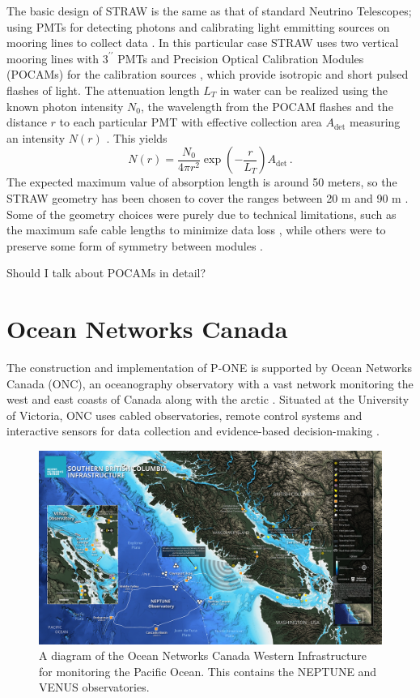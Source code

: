 The basic design of STRAW is the same as that of standard Neutrino Telescopes; using PMTs for detecting photons and calibrating light emmitting sources on mooring lines to collect data \cite{straw}. In this particular case STRAW uses two vertical mooring lines with $3^{\prime\prime}$ PMTs and Precision Optical Calibration Modules (POCAMs) for the calibration sources \cite{straw}, which provide isotropic and short pulsed flashes of light. The attenuation length $L_{T}$ in water can be realized using the known photon intensity $N_{0}$, the wavelength from the POCAM flashes and the distance $r$ to each particular PMT with effective collection area $A_{\text{det}}$ measuring an intensity $N(r)$ \cite{straw}. This yields
\begin{equation}
  N(r) = \frac{N_{0}}{4\pi r^{2}}\exp\left(-\frac{r}{L_{T}}\right)A_{\text{det}}\, .
\end{equation}
The expected maximum value of absorption length is around 50 meters, so the STRAW geometry has been chosen to cover the ranges between 20 m and 90 m \cite{straw}. Some of the geometry choices were purely due to technical limitations, such as the maximum safe cable lengths to minimize data loss \cite{straw}, while others were to preserve some form of symmetry between modules \cite{straw}.

Should I talk about POCAMs in detail? \cite{pocam}

\section{Ocean Networks Canada}

The construction and implementation of P-ONE is supported by Ocean Networks Canada (ONC), an oceanography observatory with a vast network monitoring the west and east coasts of Canada along with the arctic \cite{onc}. Situated at the University of Victoria, ONC uses cabled observatories, remote control systems and interactive sensors for data collection and evidence-based decision-making \cite{onc}. 

\begin{figure}[h]
  \centering
  \includegraphics[width=.9\textwidth]{./Figures/western_infrastructure.png}
  \caption{A diagram of the Ocean Networks Canada Western Infrastructure for monitoring the Pacific Ocean. This contains the NEPTUNE and VENUS observatories.}
  \label{fig:west_inf}
\end{figure}

